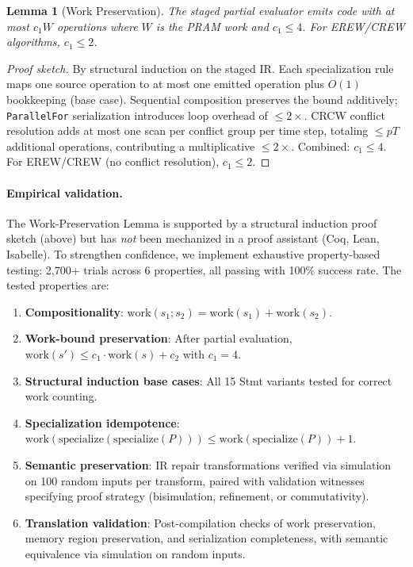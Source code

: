 \documentclass[11pt]{article}
\newtheorem{lemma}[theorem]{Lemma}
\begin{document}
\begin{lemma}[Work Preservation]
\label{lem:work}
The staged partial evaluator emits code with at most $c_1 W$ operations
where $W$ is the PRAM work and $c_1 \le 4$.  For EREW/CREW algorithms,
$c_1 \le 2$.
\end{lemma}

\begin{proof}[Proof sketch]
By structural induction on the staged IR\@.  Each specialization rule maps
one source operation to at most one emitted operation plus $O(1)$
bookkeeping (base case).  Sequential composition preserves the bound
additively; \texttt{ParallelFor} serialization introduces loop overhead
of $\le 2\times$.  CRCW conflict resolution adds at most one scan per
conflict group per time step, totaling $\le pT$ additional operations,
contributing a multiplicative $\le 2\times$.  Combined: $c_1 \le 4$.
For EREW/CREW (no conflict resolution), $c_1 \le 2$.
\end{proof}

\paragraph{Empirical validation.}
The Work-Preservation Lemma is supported by a structural induction proof
sketch (above) but has \emph{not} been mechanized in a proof assistant
(Coq, Lean, Isabelle).  To strengthen confidence, we implement exhaustive
property-based testing: 2,700+ trials across 6 properties, all passing
with 100\% success rate.  The tested properties are:

\begin{enumerate}
\item \textbf{Compositionality}: $\text{work}(s_1; s_2) = \text{work}(s_1) + \text{work}(s_2)$.
\item \textbf{Work-bound preservation}: After partial evaluation,
  $\text{work}(s') \le c_1 \cdot \text{work}(s) + c_2$ with $c_1 = 4$.
\item \textbf{Structural induction base cases}: All 15 Stmt variants
  tested for correct work counting.
\item \textbf{Specialization idempotence}:
  $\text{work}(\text{specialize}(\text{specialize}(P))) \le
  \text{work}(\text{specialize}(P)) + 1$.
\item \textbf{Semantic preservation}: IR repair transformations
  verified via simulation on 100 random inputs per transform, paired
  with validation witnesses specifying proof strategy (bisimulation,
  refinement, or commutativity).
\item \textbf{Translation validation}: Post-compilation checks of work
  preservation, memory region preservation, and serialization completeness,
  with semantic equivalence via simulation on random inputs.
\end{enumerate}
\end{document}
